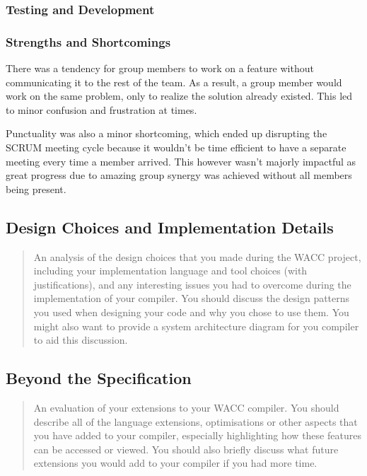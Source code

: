 \documentclass[a4paper,12pt]{article}
\begin{document}
\subsubsection*{Testing and Development}



\subsubsection*{Strengths and Shortcomings}

There was a tendency for group members to work on a feature without communicating it to the rest of the team. As a result, a group member would work on the same problem, only to realize the solution already existed. This led to minor confusion and frustration at times.

Punctuality was also a minor shortcoming, which ended up disrupting the SCRUM meeting cycle because it wouldn't be time efficient to have a separate meeting every time a member arrived. This however wasn't majorly impactful as great progress due to amazing group synergy was achieved without all members being present.

\subsection*{Design Choices and Implementation Details}

\begin{quote}
    An analysis of the design choices that you
made during the WACC project, including your implementation language and tool choices (with
justifications), and any interesting issues you had to overcome during the implementation of your
compiler. You should discuss the design patterns you used when designing your code and why you
chose to use them. You might also want to provide a system architecture diagram for you compiler
to aid this discussion.
\end{quote}


\subsection*{Beyond the Specification}

\begin{quote}
     An evaluation of your extensions to your WACC compiler. You
should describe all of the language extensions, optimisations or other aspects that you have added
to your compiler, especially highlighting how these features can be accessed or viewed. You should
also briefly discuss what future extensions you would add to your compiler if you had more time.
\end{quote}
\end{document}
